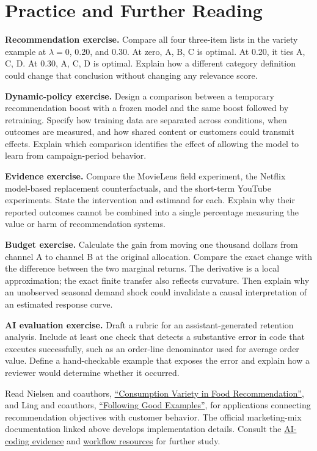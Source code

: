 \hypertarget{M08-practice-and-further-reading}{%
\section{Practice and Further
Reading}\label{M08-practice-and-further-reading}}

\noindent \textbf{Recommendation exercise.} Compare all four three-item lists in
the variety example at \(\lambda=0\), 0.20, and 0.30. At zero, A, B, C
is optimal. At 0.20, it ties A, C, D. At 0.30, A, C, D is optimal.
Explain how a different category definition could change that conclusion
without changing any relevance score.

\textbf{Dynamic-policy exercise.} Design a comparison between a
temporary recommendation boost with a frozen model and the same boost
followed by retraining. Specify how training data are separated across
conditions, when outcomes are measured, and how shared content or
customers could transmit effects. Explain which comparison identifies
the effect of allowing the model to learn from campaign-period behavior.

\textbf{Evidence exercise.} Compare the MovieLens field experiment, the
Netflix model-based replacement counterfactuals, and the short-term
YouTube experiments. State the intervention and estimand for each.
Explain why their reported outcomes cannot be combined into a single
percentage measuring the value or harm of recommendation systems.

\textbf{Budget exercise.} Calculate the gain from moving one thousand
dollars from channel A to channel B at the original allocation. Compare
the exact change with the difference between the two marginal returns.
The derivative is a local approximation; the exact finite transfer also
reflects curvature. Then explain why an unobserved seasonal demand shock
could invalidate a causal interpretation of an estimated response curve.

\textbf{AI evaluation exercise.} Draft a rubric for an
assistant-generated retention analysis. Include at least one check that
detects a substantive error in code that executes successfully, such as
an order-line denominator used for average order value. Define a
hand-checkable example that exposes the error and explain how a reviewer
would determine whether it occurred.

Read Nielsen and coauthors,
\href{https://doi.org/10.1086/720453}{``Consumption Variety in Food
Recommendation''}, and Ling and coauthors,
\href{https://doi.org/10.1145/3485447.3514193}{``Following Good
Examples''}, for applications connecting recommendation objectives with
customer behavior. The official marketing-mix documentation linked above
develops implementation details. Consult the
\href{../01_Resources/10_AI_Coding_Concepts_and_Evidence/README.md}{AI-coding
evidence} and
\href{../01_Resources/11_AI_Coding_Tools_and_Workflows/README.md}{workflow
resources} for further study.

